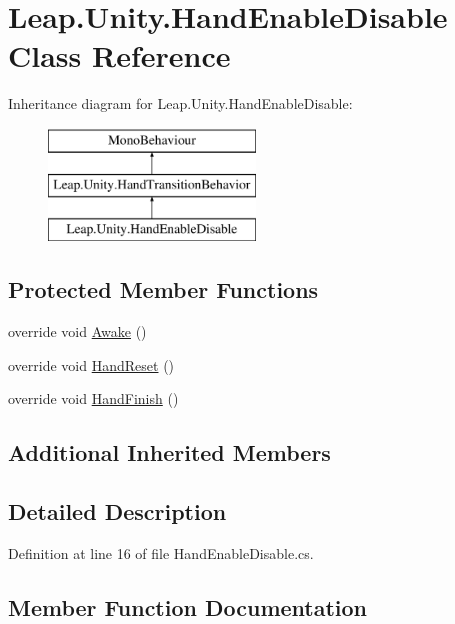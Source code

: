 \hypertarget{class_leap_1_1_unity_1_1_hand_enable_disable}{}\section{Leap.\+Unity.\+Hand\+Enable\+Disable Class Reference}
\label{class_leap_1_1_unity_1_1_hand_enable_disable}
Inheritance diagram for Leap.\+Unity.\+Hand\+Enable\+Disable\+:\begin{figure}[H]
\begin{center}
\leavevmode
\includegraphics[height=3.000000cm]{class_leap_1_1_unity_1_1_hand_enable_disable}
\end{center}
\end{figure}
\subsection*{Protected Member Functions}
\begin{DoxyCompactItemize}
\item 
override void \mbox{\hyperlink{class_leap_1_1_unity_1_1_hand_enable_disable_a3157ccde5c9e1998eb3a6788c98cca71}{Awake}} ()
\item 
override void \mbox{\hyperlink{class_leap_1_1_unity_1_1_hand_enable_disable_abb2a2d549b1b674201f32afc08994787}{Hand\+Reset}} ()
\item 
override void \mbox{\hyperlink{class_leap_1_1_unity_1_1_hand_enable_disable_a7d1c22f4a35fbe6bb4af5e204f8b4d66}{Hand\+Finish}} ()
\end{DoxyCompactItemize}
\subsection*{Additional Inherited Members}


\subsection{Detailed Description}


Definition at line 16 of file Hand\+Enable\+Disable.\+cs.



\subsection{Member Function Documentation}
\mbox{\label{class_leap_1_1_unity_1_1_hand_enable_disable_a3157ccde5c9e1998eb3a6788c98cca71}} 
